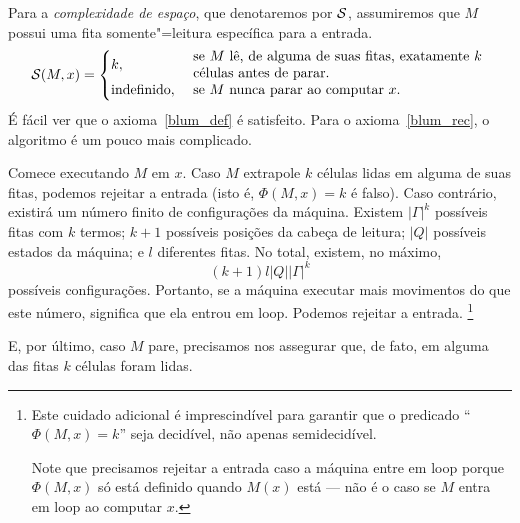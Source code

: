 \begin{example}
    \label{complexidade_espaco}
    Para a \emph{complexidade de espaço},
    que denotaremos por ${\mathcal{S}}$,
    assumiremos que $M$ possui uma fita somente"=leitura
    específica para a entrada.
    \begin{equation*}
        \PhiDS(M, x) = \begin{cases}
            k, & \text{
                \parbox{0.6\textwidth}{%
                    se $M$ lê, de alguma de suas fitas,
                    exatamente $k$ células
                    antes de parar.
                }
            } \\
            \text{indefinido}, & \text{
                \parbox{0.6\textwidth}{
                    se $M$ nunca parar ao computar $x$.
                }
            }
        \end{cases}
    \end{equation*}
    É fácil ver que o axioma~\ref{blum_def} é satisfeito.
    Para o axioma~\ref{blum_rec},
    o algoritmo é um pouco mais complicado.

    Comece executando $M$ em $x$.
    Caso $M$ extrapole $k$ células lidas
    em alguma de suas fitas,
    podemos rejeitar a entrada
    (isto é, $\Phi(M, x) = k$ é falso).
    Caso contrário,
    existirá um número finito de configurações da máquina.
    Existem $|\Gamma|^k$ possíveis fitas com $k$ termos;
    $k+1$ possíveis posições da cabeça de leitura;
    $|Q|$ possíveis estados da máquina;
    e $l$ diferentes fitas.
    No total, existem, no máximo,
    \begin{equation}
        (k+1) l |Q||\Gamma|^k
        \label{num_possiveis_configuracoes}
    \end{equation}
    possíveis configurações.
    Portanto, se a máquina executar
    mais movimentos do que este número,
    significa que ela entrou em loop.
    Podemos rejeitar a entrada.
    \footnote{
        Este cuidado adicional é imprescindível
        para garantir que o predicado
        ``$\Phi(M, x) = k$''
        seja decidível,
        não apenas semidecidível.

        Note que precisamos rejeitar a entrada
        caso a máquina entre em loop
        porque $\Phi(M, x)$ só está definido
        quando $M(x)$ está
        --- não é o caso se $M$ entra em loop
        ao computar $x$.
    }

    E, por último,
    caso $M$ pare,
    precisamos nos assegurar que,
    de fato,
    em alguma das fitas $k$ células foram lidas.
\end{example}

